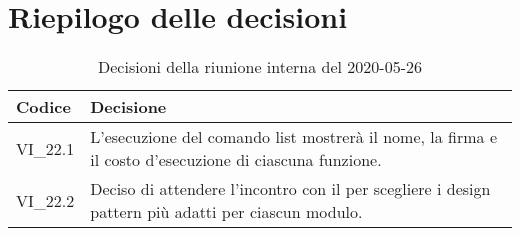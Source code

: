 \section{Riepilogo delle decisioni}
\begin{longtable}{ 
	 >{\centering}p{} >{}p{} }
	
	\caption{Decisioni della riunione interna del 2020-05-26}\\	
	
	\textbf{\color{white}Codice} & 
	\textbf{\color{white}Decisione} 
	\tabularnewline  
	\endhead
	
	VI\_22.1 & L'esecuzione del comando list mostrerà il nome, la firma e il costo d'esecuzione di ciascuna funzione. \\
	VI\_22.2 & Deciso di attendere l'incontro con il \RC{} per scegliere i design pattern\ped{\textit{G}} più adatti per ciascun modulo. \\
\end{longtable}
